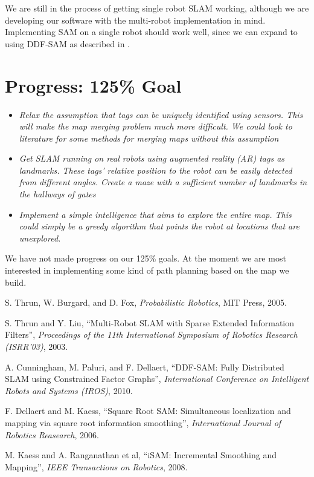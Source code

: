 \documentclass[11pt]{article}
\begin{document}
We are still in the process of getting single robot SLAM working, although we are developing our software with the multi-robot implementation in mind. Implementing SAM on a single robot should work well, since we can expand to using DDF-SAM as described in \cite{cunningham2010}.

\section{Progress: 125\% Goal}
\begin{itemize}
    \item \emph{Relax the assumption that tags can be uniquely identified using sensors. This will make the map merging problem much more difficult. We could look to literature for some methods for merging maps without this assumption}
    \item \emph{Get SLAM running on real robots using augmented reality (AR) tags as landmarks. These tags' relative position to the robot can be easily detected from different angles. Create a maze with a sufficient number of landmarks in the hallways of gates}
    \item \emph{Implement a simple intelligence that aims to explore the entire map. This could simply be a greedy algorithm that points the robot at locations that are unexplored.}
\end{itemize}

We have not made progress on our 125\% goals. At the moment we are most interested in implementing some kind of path planning based on the map we build.

\begin{thebibliography}{12}
        S. Thrun, W. Burgard, and D. Fox, \emph{Probabilistic Robotics}, MIT Press, 2005.

        S. Thrun and Y. Liu, ``Multi-Robot SLAM with Sparse Extended Information Filters'', \emph{Proceedings of the 11th International Symposium of Robotics Research (ISRR'03)}, 2003.

        A. Cunningham, M. Paluri, and F. Dellaert, ``DDF-SAM: Fully Distributed SLAM using Constrained Factor Graphs'', \emph{International Conference on Intelligent Robots and Systems (IROS)}, 2010.

        F. Dellaert and M. Kaess, ``Square Root SAM: Simultaneous localization and mapping via square root information smoothing'', \emph{International Journal of Robotics Reasearch}, 2006.

        M. Kaess and A. Ranganathan et al, ``iSAM: Incremental Smoothing and Mapping'', \emph{IEEE Transactions on Robotics}, 2008.

\end{thebibliography}
\end{document}
